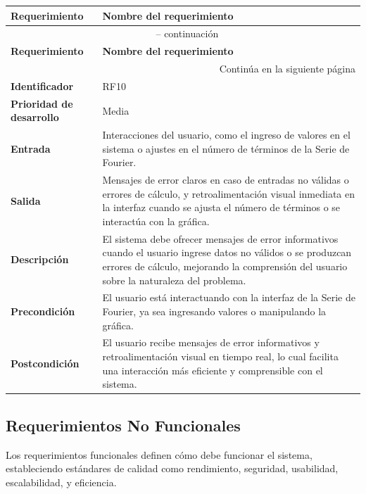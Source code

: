 \begin{longtable}{|m{3.5cm}|m{9.5cm}|}
	\hline
	\rowcolor{black!75} \color{white}\textbf{Requerimiento} & \color{white}\textbf{Nombre del requerimiento} \\
	\hline
	\endfirsthead
	\multicolumn{2}{c}{{\tablename\ \thetable{} -- continuación}} \\
	\hline
	\rowcolor{black!75} \color{white}\textbf{Requerimiento} & \color{white}\textbf{Nombre del requerimiento} \\
	\hline
	\endhead
	\hline \multicolumn{2}{r}{{Continúa en la siguiente página}} \\
	\endfoot
	\hline
	\endlastfoot
	
	\textbf{Identificador} & RF10 \\
	\hline
	\textbf{Prioridad de desarrollo} & Media \\
	\hline
	\textbf{Entrada} & Interacciones del usuario, como el ingreso de valores en el sistema o ajustes en el número de términos de la Serie de Fourier. \\
	\hline
	\textbf{Salida} & Mensajes de error claros en caso de entradas no válidas o errores de cálculo, y retroalimentación visual inmediata en la interfaz cuando se ajusta el número de términos o se interactúa con la gráfica. \\
	\hline
	\textbf{Descripción} & El sistema debe ofrecer mensajes de error informativos cuando el usuario ingrese datos no válidos o se produzcan errores de cálculo, mejorando la comprensión del usuario sobre la naturaleza del problema.\\
	\hline
	\textbf{Precondición} & El usuario está interactuando con la interfaz de la Serie de Fourier, ya sea ingresando valores o manipulando la gráfica. \\
	\hline
	\textbf{Postcondición} & El usuario recibe mensajes de error informativos y retroalimentación visual en tiempo real, lo cual facilita una interacción más eficiente y comprensible con el sistema. \\
	\hline
\end{longtable}
\caption{Requerimiento funcional No. 10} \label{tabla:RF10}
\vspace{0.5cm}




\subsection{Requerimientos No Funcionales}
Los requerimientos funcionales definen cómo debe funcionar el sistema, estableciendo estándares de calidad como rendimiento, seguridad, usabilidad, escalabilidad, y eficiencia.

